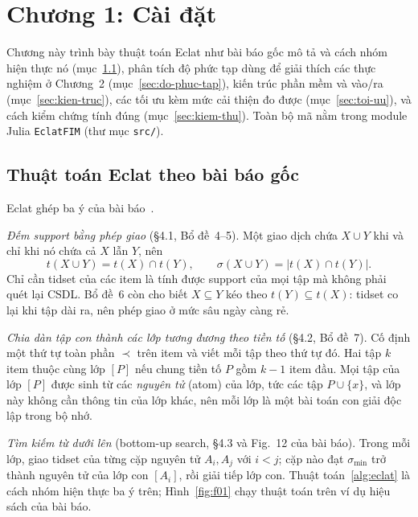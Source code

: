 \section{Chương 1: Cài đặt}
\label{sec:cai-dat}

Chương này trình bày thuật toán Eclat như bài báo gốc mô tả và cách nhóm hiện thực nó (mục~\ref{sec:thuat-toan}), phân tích độ phức tạp dùng để giải thích các thực nghiệm ở Chương~2 (mục~\ref{sec:do-phuc-tap}), kiến trúc phần mềm và vào/ra (mục~\ref{sec:kien-truc}), các tối ưu kèm mức cải thiện đo được (mục~\ref{sec:toi-uu}), và cách kiểm chứng tính đúng (mục~\ref{sec:kiem-thu}). Toàn bộ mã nằm trong module Julia \texttt{EclatFIM} (thư mục \texttt{src/}).

\subsection{Thuật toán Eclat theo bài báo gốc}
\label{sec:thuat-toan}

Eclat ghép ba ý của bài báo~\cite{zaki2000scalable}.

\emph{Đếm support bằng phép giao} (§4.1, Bổ đề~4--5). Một giao dịch chứa $X \cup Y$ khi và chỉ khi nó chứa cả $X$ lẫn $Y$, nên
\begin{equation}
t(X \cup Y) = t(X) \cap t(Y), \qquad \sigma(X \cup Y) = |t(X) \cap t(Y)|.
\label{eq:giao}
\end{equation}
Chỉ cần tidset của các item là tính được support của mọi tập mà không phải quét lại CSDL. Bổ đề~6 còn cho biết $X \subseteq Y$ kéo theo $t(Y) \subseteq t(X)$: tidset co lại khi tập dài ra, nên phép giao ở mức sâu ngày càng rẻ.

\emph{Chia dàn tập con thành các lớp tương đương theo tiền tố} (§4.2, Bổ đề~7). Cố định một thứ tự toàn phần $\prec$ trên item và viết mỗi tập theo thứ tự đó. Hai tập $k$ item thuộc cùng lớp $[P]$ nếu chung tiền tố $P$ gồm $k-1$ item đầu. Mọi tập của lớp $[P]$ được sinh từ các \emph{nguyên tử} (atom) của lớp, tức các tập $P \cup \{x\}$, và lớp này không cần thông tin của lớp khác, nên mỗi lớp là một bài toán con giải độc lập trong bộ nhớ.

\emph{Tìm kiếm từ dưới lên} (bottom-up search, §4.3 và Fig.~12 của bài báo). Trong mỗi lớp, giao tidset của từng cặp nguyên tử $A_i, A_j$ với $i < j$; cặp nào đạt $\sigma_{\min}$ trở thành nguyên tử của lớp con $[A_i]$, rồi giải tiếp lớp con. Thuật toán~\ref{alg:eclat} là cách nhóm hiện thực ba ý trên; Hình~\ref{fig:f01} chạy thuật toán trên ví dụ hiệu sách của bài báo.

